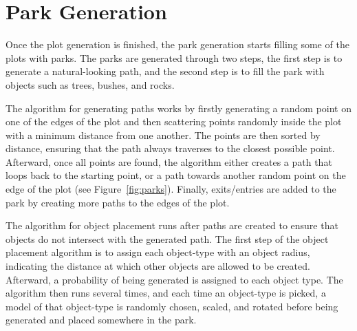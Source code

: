 \section{Park Generation}

Once the plot generation is finished, the park generation starts filling some of the plots with parks.
The parks are generated through two steps, the first step is to generate a natural-looking path, and the second step is to fill the park with objects such as trees, bushes, and rocks.

The algorithm for generating paths works by firstly generating a random point on one of the edges of the plot and then scattering points randomly inside the plot with a minimum distance from one another.
The points are then sorted by distance, ensuring that the path always traverses to the closest possible point.
Afterward, once all points are found, the algorithm either creates a path that loops back to the starting point, or a path towards another random point on the edge of the plot (see Figure~\ref{fig:parks}).
Finally, exits/entries are added to the park by creating more paths to the edges of the plot.

The algorithm for object placement runs after paths are created to ensure that objects do not intersect with the generated path.
The first step of the object placement algorithm is to assign each object-type with an object radius, indicating the distance at which other objects are allowed to be created.
Afterward, a probability of being generated is assigned to each object type.
The algorithm then runs several times, and each time an object-type is picked, a model of that object-type is randomly chosen, scaled, and rotated before being generated and placed somewhere in the park.

